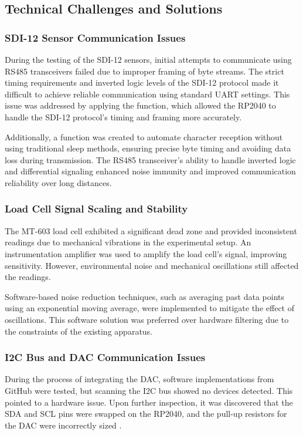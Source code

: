 \subsection{Technical Challenges and Solutions}

\subsubsection{SDI-12 Sensor Communication Issues}
During the testing of the SDI-12 sensors, initial attempts to communicate using RS485 transceivers failed due to improper framing of byte streams. The strict timing requirements and inverted logic levels of the SDI-12 protocol made it difficult to achieve reliable communication using standard UART settings. This issue was addressed by applying the  function, which allowed the RP2040 to handle the SDI-12 protocol's timing and framing more accurately.

Additionally, a  function was created to automate character reception without using traditional sleep methods, ensuring precise byte timing and avoiding data loss during transmission. The RS485 transceiver's ability to handle inverted logic and differential signaling enhanced noise immunity and improved communication reliability over long distances.

\subsubsection{Load Cell Signal Scaling and Stability}
The MT-603 load cell exhibited a significant dead zone and provided inconsistent readings due to mechanical vibrations in the experimental setup. An instrumentation amplifier was used to amplify the load cell's signal, improving sensitivity. However, environmental noise and mechanical oscillations still affected the readings.

Software-based noise reduction techniques, such as averaging past data points using an exponential moving average, were implemented to mitigate the effect of oscillations. This software solution was preferred over hardware filtering due to the constraints of the existing apparatus.

\subsubsection{I2C Bus and DAC Communication Issues}
During the process of integrating the DAC, software implementations from GitHub were tested, but scanning the I2C bus showed no devices detected. This pointed to a hardware issue. Upon further inspection, it was discovered that the SDA and SCL pins were swapped on the RP2040, and the pull-up resistors for the DAC were incorrectly sized \cite{DAC_datasheet}.

